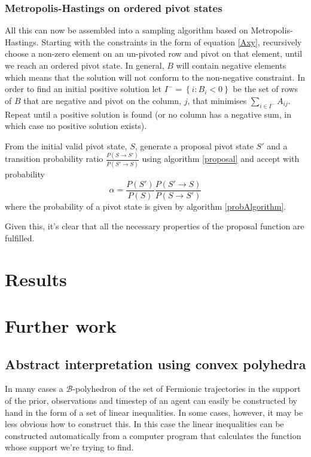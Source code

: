 \documentclass{article}
\begin{document}
\subsubsection{Metropolis-Hastings on ordered pivot states}

All this can now be assembled into a sampling algorithm based on Metropolis-Hastings. Starting with the constraints in the form of equation \ref{Axy}, recursively choose a non-zero element on an un-pivoted row and pivot on that element, until we reach an ordered pivot state. In general, $B$ will contain negative elements which means that the solution will not conform to the non-negative constraint. In order to find an initial positive solution let $I^- = \left\{i: B_i < 0\right\}$ be the set of rows of $B$ that are negative and pivot on the column, $j$, that minimises $\sum_{i\in I^-}A_{ij}$. Repeat until a positive solution is found (or no column has a negative sum, in which case no positive solution exists).

From the initial valid pivot state, $S$, generate a proposal pivot state $S'$ and a transition probability ratio $\frac{P(S\rightarrow S')}{P(S' \rightarrow S)}$ using algorithm \ref{proposal} and accept with probability
\[
\alpha = \frac{P(S')}{P(S)}\frac{P(S'\rightarrow S)}{P(S \rightarrow S')}
\]
where the probability of a pivot state is given by algorithm \ref{probAlgorithm}.

Given this, it's clear that all the necessary properties of the proposal function are fulfilled.

\section{Results}

\section{Further work}
\subsection{Abstract interpretation using convex polyhedra}

In many cases a $\mathcal{B}$-polyhedron of the set of Fermionic trajectories in the support of the prior, observations and timestep of an agent can easily be constructed by hand in the form of a set of linear inequalities. In some cases, however, it may be less obvious how to construct this. In this case the linear inequalities can be constructed automatically from a computer program that calculates the function whose support we're trying to find.
\end{document}
